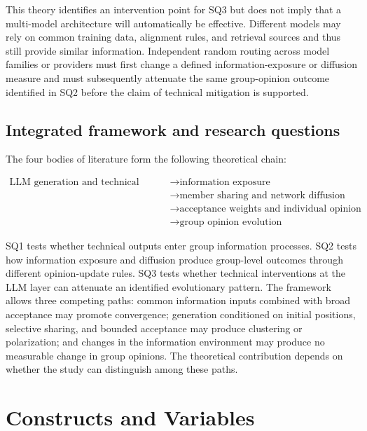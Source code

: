 \documentclass[11pt,a4paper]{article}
\begin{document}
This theory identifies an intervention point for SQ3 but does not imply that a multi-model architecture will automatically be effective. Different models may rely on common training data, alignment rules, and retrieval sources and thus still provide similar information. Independent random routing across model families or providers must first change a defined information-exposure or diffusion measure and must subsequently attenuate the same group-opinion outcome identified in SQ2 before the claim of technical mitigation is supported.

\subsection{Integrated framework and research questions}

The four bodies of literature form the following theoretical chain:

\begin{equation*}
\begin{aligned}\text{LLM generation and technical configuration} &\rightarrow \text{information exposure} \\
&\rightarrow \text{member sharing and network diffusion} \\
&\rightarrow \text{acceptance weights and individual opinion updating} \\
&\rightarrow \text{group opinion evolution}\end{aligned}
\end{equation*}

SQ1 tests whether technical outputs enter group information processes. SQ2 tests how information exposure and diffusion produce group-level outcomes through different opinion-update rules. SQ3 tests whether technical interventions at the LLM layer can attenuate an identified evolutionary pattern. The framework allows three competing paths: common information inputs combined with broad acceptance may promote convergence; generation conditioned on initial positions, selective sharing, and bounded acceptance may produce clustering or polarization; and changes in the information environment may produce no measurable change in group opinions. The theoretical contribution depends on whether the study can distinguish among these paths.

\section{Constructs and Variables}
\end{document}
